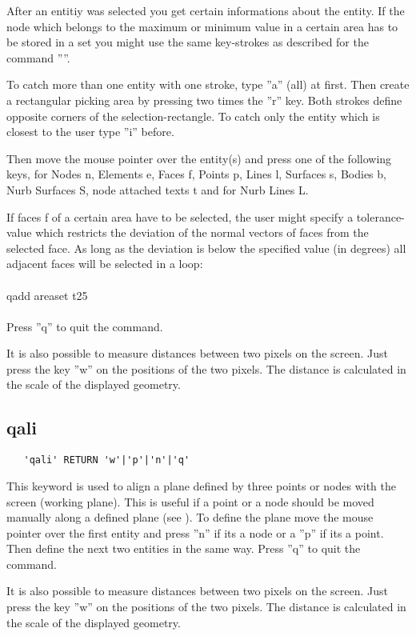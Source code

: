 \documentclass{article}
\begin{document}
After an entitiy was selected you get certain informations about the entity. If the node which belongs to the maximum or minimum value in a certain area has to be stored in a set you might use the same key-strokes as described for the command ''''.

To catch more than one entity with one stroke, type ''a'' (all) at first. Then create a rectangular picking area by pressing two times the ''r'' key. Both strokes define opposite corners of the selection-rectangle. To catch only the entity which is closest to the user type ''i'' before.

Then move the mouse pointer over the entity(s) and press one of the following keys, for Nodes n, Elements e, Faces f, Points p, Lines l, Surfaces s, Bodies b, Nurb Surfaces S, node attached texts t and for Nurb Lines L.

If faces f of a certain area have to be selected, the user might specify a tolerance-value which restricts the deviation of the normal vectors of faces from the selected face. As long as the deviation is below the specified value (in degrees) all adjacent faces will be selected in a loop:\\\\ qadd areaset t25\\\\

Press ''q'' to quit the command. 

It is also possible to measure distances between two pixels on the screen. Just press the key ''w'' on the positions of the two pixels. The distance is calculated in the scale of the displayed geometry.

\subsection{\label{qali}qali}
\begin{verbatim}
   'qali' RETURN 'w'|'p'|'n'|'q' 
\end{verbatim}
This keyword is used to align a plane defined by three points or nodes with the screen (working plane). This is useful if a point or a node should be moved manually along a defined plane (see ). To define the plane move the mouse pointer over the first entity and press ''n'' if its a node or a ''p'' if its a point. Then define the next two entities in the same way. Press ''q'' to quit the command. 

It is also possible to measure distances between two pixels on the screen. Just press the key ''w'' on the positions of the two pixels. The distance is calculated in the scale of the displayed geometry.
\end{document}
